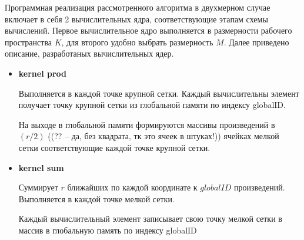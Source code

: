 Программная реализация рассмотренного алгоритма в двухмерном случае
включает в себя 2 вычислительных ядра, соответствующие этапам схемы вычислений.
Первое вычислительное ядро выполняется в размерности рабочего пространства $K$,
для второго удобно выбрать размерность $M$.
Далее приведено описание, разработаных вычислительных ядер.
\begin{itemize}
\item
  {\bf kernel prod}

  Выполняется в каждой точке крупной сетки.
  Каждый вычислительны элемент 
  получает точку крупной сетки
  из глобальной памяти по индексу globalID. 
  

  На выходе в глобальной памяти
  формируются массивы произведений в $(r/2)$ ((?? -- да, без квадрата, тк это ячеек в штуках!))
  ячейках мелкой сетки  
  соответствующие каждой точке крупной сетки.

  
\item
  {\bf kernel sum}

  Суммирует $r$ ближайших по каждой координате к $globalID$ произведений. 
  Выполняется в каждой точке мелкой сетки.
  
  
  Каждый вычислительный элемент записывает свою точку мелкой сетки в
  массив в глобальную память по индексу globalID
\end{itemize}






